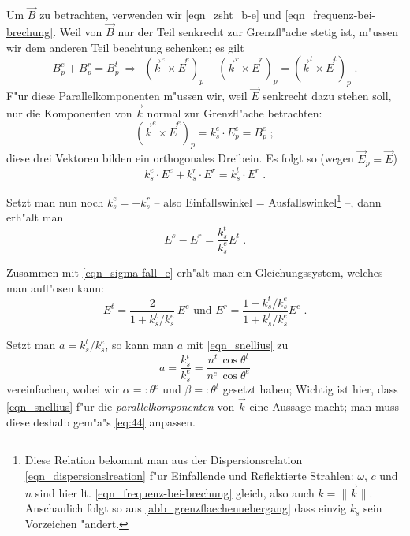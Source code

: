 \documentclass[twoside,a4paper]{book}
\newcommand{\Folgt}{\ensuremath{~ \Rightarrow ~ ~ }}
\begin{document}
Um $\vec B$ zu betrachten, verwenden wir
\eqref{eqn_zsht_b-e} und \eqref{eqn_frequenz-bei-brechung}. Weil von
$\vec B$ nur der Teil senkrecht zur Grenzfl"ache stetig ist, m"ussen
wir dem anderen Teil beachtung schenken; es gilt
\begin{equation*}
   B^e_p + B^r_p = B^t_p \Folgt
(\vec k^e \times \vec E^e)_p + (\vec k^r \times \vec E^r)_p = (\vec k^t
\times \vec E^t)_p  \;.
\end{equation*}
F"ur diese Parallelkomponenten m"ussen wir, weil $\vec E$ senkrecht
dazu stehen soll, nur die Komponenten von $\vec k$ normal zur
Grenzfl"ache betrachten:
\begin{equation*}
   (\vec k^e \times \vec E^e)_p =  k^e_s \cdot E_p^e = B^e_p \;;
\end{equation*}
diese drei Vektoren bilden ein orthogonales Dreibein. Es folgt so
(wegen $\vec E_p = \vec E$)
\begin{equation*}
   k^e_s \cdot  E^e + k^r_s \cdot E^r  = k^t_s
\cdot E^r  \;.
\end{equation*}

Setzt man nun noch $k_s^e = - k_s^r$ -- also Einfallswinkel =
Ausfallswinkel\footnote{\label{fn:1}Diese Relation bekommt man aus der
  Dispersionsrelation \eqref{eqn_dispersionslreation} f"ur Einfallende
und Reflektierte Strahlen: $\omega$, $c$ und $n$ sind hier
lt. \eqref{eqn_frequenz-bei-brechung} gleich, also auch $k = \|\vec
k\|$. Anschaulich folgt so aus \ref{abb_grenzflaechenuebergang} dass
einzig $k_s$ sein Vorzeichen "andert.} --, dann erh"alt man
\begin{equation}
   \label{eqn_sigma-fall-b}
   E^s - E^r = \frac{k^t_s}{k^e_s} E^t \;.
\end{equation}

Zusammen mit \eqref{eqn_sigma-fall_e} erh"alt man ein
Gleichungssystem, welches man aufl"osen kann:
\begin{equation}
   \label{eq:41}
   E^t = \frac{2}{1 + k^t_s / k^e_s} \, E^e \text{ und } 
   E^r = \frac{1 - k^t_s / k^e_s}{1 + k^t_s / k^e_s } E^e \;.
\end{equation}

Setzt man  $a = k^t_s / k^e_s$, so kann man $a$ mit
\eqref{eqn_snellius} zu
\begin{equation*}
   a = \frac{k^t_s}{k^e_s} = \frac{n^t \, \cos \theta^t}{n^e \, \cos \theta^e}
\end{equation*}
vereinfachen, wobei wir $\alpha =: \theta^e$ und
$\beta =: \theta^t$ gesetzt haben; Wichtig ist hier, dass
\eqref{eqn_snellius} f"ur die \emph{parallelkomponenten} von $\vec k$
eine Aussage macht; man muss diese deshalb gem"a"s \eqref{eq:44}
anpassen.
\end{document}
